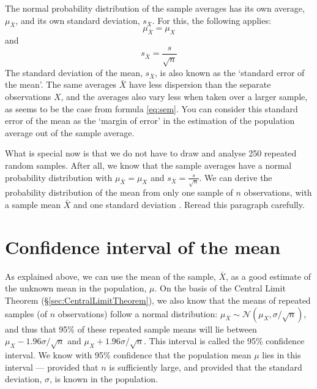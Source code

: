 \documentclass[
]{book}
\begin{document}
The normal probability distribution of the sample averages has its own average,
\(\mu_{\bar{X}}\), and its own standard deviation,
\(s_{\bar{X}}\). For this, the following applies:
\begin{equation}
    \mu_{\bar{X}} = \mu_X
    \label{eq:meanofmean}
\end{equation}
and
\begin{equation}
    s_{\bar{X}} = \frac{s}{\sqrt{n}}
    \label{eq:sem}
\end{equation}
The standard deviation of the
mean, \(s_{\bar{X}}\), is also known as the `standard error of
the mean'. The same averages \(\bar{X}\) have less dispersion than the separate
observations \(X\), and the averages also vary less when taken over a larger
sample, as seems to be the case from formula \eqref{eq:sem}. You can consider this
standard error of the mean as the `margin of error' in the estimation
of the population average out of the sample average.

What is special now is that we do not have to draw and analyse 250 repeated
random samples. After all, we know that the sample averages have a normal
probability distribution with
\(\mu_{\bar{X}} = \mu_X\) and \(s_{\bar{X}} = \frac{s}{\sqrt{n}}\). We can
derive the probability distribution of the mean from only one sample of
\(n\) observations, with a sample mean \(\bar{X}\) and one standard
deviation \citep{Cumm12}. Reread this paragraph carefully.

\hypertarget{sec:confidenceinterval-mean}{%
\section{Confidence interval of the mean}\label{sec:confidenceinterval-mean}}

As explained above, we can use the mean of the sample, \(\bar{X}\),
as a good estimate of the unknown mean in the population, \(\mu\). On
the basis of the Central Limit Theorem (§\ref{sec:CentralLimitTheorem}),
we also know that the means of repeated samples (of \(n\) observations) follow a
normal distribution: \(\mu_{\bar{X}} \sim \mathcal{N}(\mu_{X},\sigma/\sqrt{n})\),
and thus that 95\% of these repeated sample means will lie between
\(\mu_{X}-1.96\sigma/\sqrt{n}\) and \(\mu_{X}+1.96\sigma/\sqrt{n}\).
This interval is called the 95\% confidence interval. We know with
95\% confidence that the population mean \(\mu\) lies in this interval
--- provided that \(n\) is sufficiently large, and provided that the standard
deviation, \(\sigma\), is known in the population.
\end{document}
